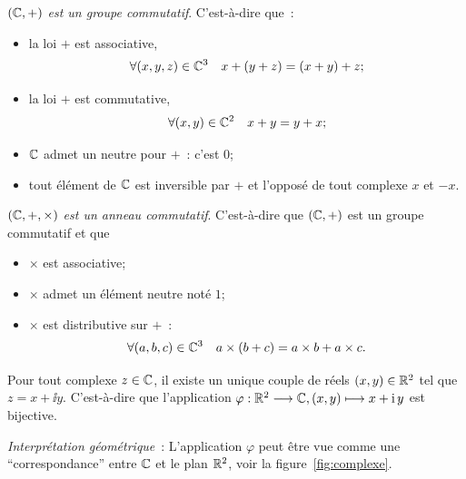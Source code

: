 \begin{prop}
  \emph{\((\mathbb{C}, + )\) est un groupe commutatif}. C'est-à-dire que~:
  \begin{itemize}
    \item la loi \( + \) est associative,
      \begin{equation}
        \forall (x, y, z) \in{}\mathbb{C}^3 \quad x + (y + z) = (x + y) + z;
      \end{equation}
    \item la loi \( + \) est commutative,
      \begin{equation}
        \forall (x,y) \in{}\mathbb{C}^2 \quad x + y = y + x;
      \end{equation}
    \item \(\mathbb{C}\) admet un neutre pour \(+\)~: c'est \(0\);
    \item tout élément de \(\mathbb{C}\) est inversible par \(+\) et l'opposé de 
      tout complexe \(x\) et \(-x\).
  \end{itemize}
\end{prop}

\begin{prop}
  \emph{\((\mathbb{C}, + ,\times)\) est un anneau commutatif}. C'est-à-dire que \((\mathbb{C}, 
  + )\) est un groupe commutatif et que
  \begin{itemize}
    \item \(\times\) est associative;
    \item \(\times\) admet un élément neutre noté \(1\);
    \item \(\times\) est distributive sur \( + \)~:
      \begin{equation}
        \forall (a, b, c) \in{}\mathbb{C}^3 \quad a \times (b + c) = a \times b + 
        a \times c.
      \end{equation}
  \end{itemize}
\end{prop}

\begin{prop}
  Pour tout complexe \(z \in{}\mathbb{C}\), il existe un unique couple de réels \((x, 
  y) \in{}\mathbb{R}^2\) tel que \(z = x + \ii{}y\). C'est-à-dire que l'application 
  \(\varphi:\mathbb{R}^2 \longrightarrow{} \mathbb{C}, (x, y) \longmapsto{} x + \operatorname{i}{}y\) est bijective.
\end{prop}

\emph{Interprétation géométrique}~: L'application \(\varphi\) peut être vue comme 
une ``correspondance'' entre \(\mathbb{C}\) et le plan \(\mathbb{R}^2\), voir la 
figure~\ref{fig:complexe}.

